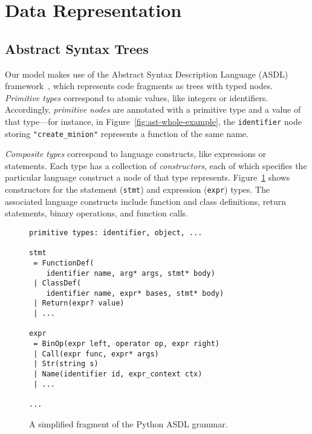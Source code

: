 \documentclass[11pt,a4paper]{article}
\begin{document}
\section{Data Representation}

\subsection{Abstract Syntax Trees}



Our model makes use of the Abstract Syntax Description Language (ASDL) framework~\citep{Wang97ASDL}, which represents code fragments as trees with typed nodes. {\it Primitive types} correspond to atomic values, like integers or identifiers. Accordingly, {\it primitive nodes} are annotated with a primitive type and a value of that type---for instance, in Figure~\ref{fig:ast-whole-example}, the \texttt{identifier} node storing \texttt{"create\_minion"} represents a function of the same name.

{\it Composite types} correspond to language constructs, like expressions or statements. Each type has a collection of {\it constructors}, each of which specifies the particular language construct a node of that type represents. Figure~\ref{fig:python-grammar-fragment} shows constructors for the statement ({\tt stmt}) and expression ({\tt expr}) types. The associated language constructs include function and class definitions, return statements, binary operations, and function calls.

\begin{figure}[h]
\begin{verbatim}
primitive types: identifier, object, ...

stmt
 = FunctionDef(
    identifier name, arg* args, stmt* body)
 | ClassDef(
    identifier name, expr* bases, stmt* body)
 | Return(expr? value)
 | ...

expr
 = BinOp(expr left, operator op, expr right)
 | Call(expr func, expr* args)
 | Str(string s)
 | Name(identifier id, expr_context ctx)
 | ...

...
\end{verbatim}
\caption{A simplified fragment of the Python ASDL grammar.\footnotemark}
\label{fig:python-grammar-fragment}
\end{figure}

\end{document}
